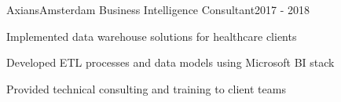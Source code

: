 \resumeSubheading
  {Axians}{Amsterdam}
  {Business Intelligence Consultant}{2017 - 2018}
  \vspace{\experienceItemSpacing}
  \resumeItemListStart
\item Implemented data warehouse solutions for healthcare clients
\item Developed ETL processes and data models using Microsoft BI stack
\item Provided technical consulting and training to client teams
  \resumeItemListEnd